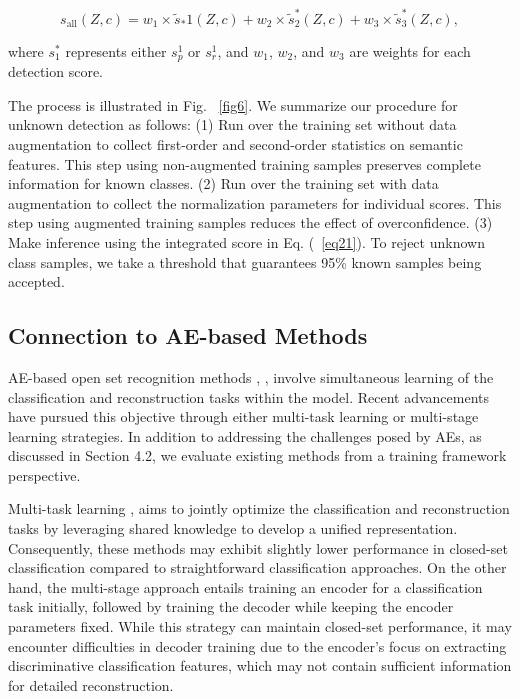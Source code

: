 \documentclass{gji}
\begin{document}
    \[ s_{\text{all}}(Z, c) = w_1 \times \tilde{s}_*1(Z, c) + w_2 \times \tilde{s}^*_2(Z, c) + w_3 \times \tilde{s}^*_3(Z, c), \tag{21} \label{eq21} \]

    where $s^*_1$ represents either $s_p^1$ or $s_r^1$, and $w_1$, $w_2$, and $w_3$ are weights for each detection score.
    

    
    The process is illustrated in Fig. ~\ref{fig6}. We summarize our procedure for unknown detection as follows: (1) Run over the training set without data augmentation to collect first-order and second-order statistics on semantic features. This step using non-augmented training samples preserves complete information for known classes. (2) Run over the training set with data augmentation to collect the normalization parameters for individual scores. This step using augmented training samples reduces the effect of overconfidence. (3) Make inference using the integrated score in Eq. (~\ref{eq21}). To reject unknown class samples, we take a threshold that guarantees 95\% known samples being accepted.

\subsection{Connection to AE-based Methods}

AE-based open set recognition methods \cite{26}, \cite{27}, \cite{36} involve simultaneous learning of the classification and reconstruction tasks within the model. Recent advancements have pursued this objective through either multi-task learning or multi-stage learning strategies. In addition to addressing the challenges posed by AEs, as discussed in Section 4.2, we evaluate existing methods from a training framework perspective.

Multi-task learning \cite{27}, \cite{36} aims to jointly optimize the classification and reconstruction tasks by leveraging shared knowledge to develop a unified representation. Consequently, these methods may exhibit slightly lower performance in closed-set classification compared to straightforward classification approaches. On the other hand, the multi-stage approach \cite{26} entails training an encoder for a classification task initially, followed by training the decoder while keeping the encoder parameters fixed. While this strategy can maintain closed-set performance, it may encounter difficulties in decoder training due to the encoder's focus on extracting discriminative classification features, which may not contain sufficient information for detailed reconstruction.
\end{document}
